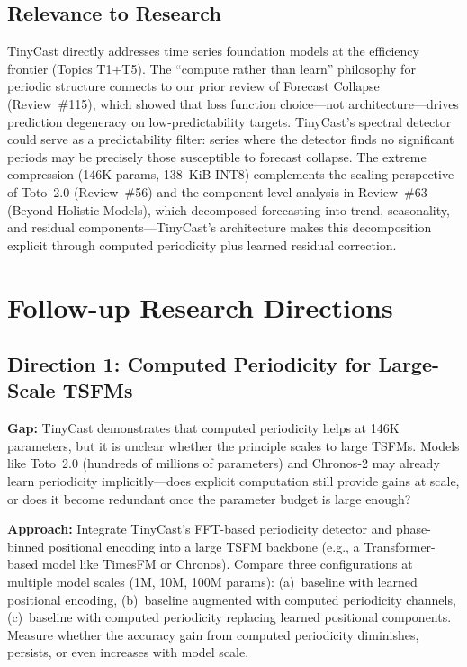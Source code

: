 \documentclass[11pt,a4paper]{article}
\begin{document}
\subsection{Relevance to Research}
TinyCast directly addresses time series foundation models at the efficiency frontier (Topics T1$+$T5). The ``compute rather than learn'' philosophy for periodic structure connects to our prior review of Forecast Collapse (Review~\#115), which showed that loss function choice---not architecture---drives prediction degeneracy on low-predictability targets. TinyCast's spectral detector could serve as a predictability filter: series where the detector finds no significant periods may be precisely those susceptible to forecast collapse. The extreme compression (146K params, 138~KiB INT8) complements the scaling perspective of Toto~2.0 (Review~\#56) and the component-level analysis in Review~\#63 (Beyond Holistic Models), which decomposed forecasting into trend, seasonality, and residual components---TinyCast's architecture makes this decomposition explicit through computed periodicity plus learned residual correction.

\section{Follow-up Research Directions}

\subsection{Direction 1: Computed Periodicity for Large-Scale TSFMs}
\textbf{Gap:} TinyCast demonstrates that computed periodicity helps at 146K parameters, but it is unclear whether the principle scales to large TSFMs. Models like Toto~2.0 (hundreds of millions of parameters) and Chronos-2 may already learn periodicity implicitly---does explicit computation still provide gains at scale, or does it become redundant once the parameter budget is large enough?

\textbf{Approach:} Integrate TinyCast's FFT-based periodicity detector and phase-binned positional encoding into a large TSFM backbone (e.g., a Transformer-based model like TimesFM or Chronos). Compare three configurations at multiple model scales (1M, 10M, 100M params): (a)~baseline with learned positional encoding, (b)~baseline augmented with computed periodicity channels, (c)~baseline with computed periodicity replacing learned positional components. Measure whether the accuracy gain from computed periodicity diminishes, persists, or even increases with model scale.
\end{document}
